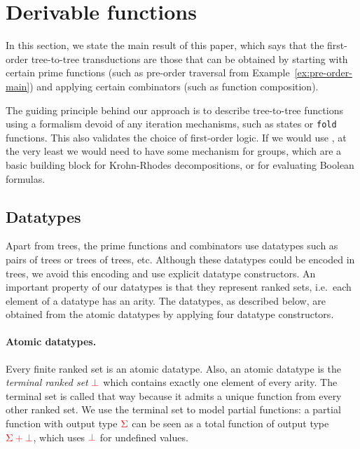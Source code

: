 \section{Derivable functions}\label{sec:derivable-functions}
In this section, we state the main result of this paper, which says that the  first-order tree-to-tree transductions are those that  can be  obtained by starting with certain prime functions (such as pre-order traversal from Example~\ref{ex:pre-order-main}) and applying certain  combinators (such as function composition). 

The guiding principle behind our approach is to describe tree-to-tree functions using a formalism devoid of any iteration mechanisms, such as states or {\tt fold} functions. This also validates the choice of first-order logic. If we would use \mso, at the very least we would need to have some mechanism for groups, which are a basic building block for Krohn-Rhodes decompositions, or for evaluating Boolean formulas. 


\subsection{Datatypes}
\label{sec:datatype-constructors}
Apart from trees, the prime functions and combinators  use  datatypes  such as pairs of trees or trees of trees, etc. Although these datatypes  could be encoded in trees, we avoid this encoding and use explicit datatype constructors. An important property of our datatypes is that they represent ranked sets, i.e.~each element of a datatype has an arity. The datatypes, as described below, are obtained from the atomic datatypes by applying four datatype constructors.

\paragraph*{Atomic datatypes.} Every finite ranked set is an atomic datatype. Also, an atomic datatype is the   \emph{terminal ranked set}  ${\color{red}{\bot}}$ which contains exactly one element of every arity.
The terminal set is called that way because it admits a unique function from every other ranked set. 
We use the terminal set to model partial functions: a partial function with output  type  ${\color{red}{\Sigma}}$ can be seen as a total function of output type ${\color{red}{{\color{red}{\Sigma}}+ {\color{red}{\bot}}}}$, which uses  ${\color{red}{\bot}}$  for  undefined values.


